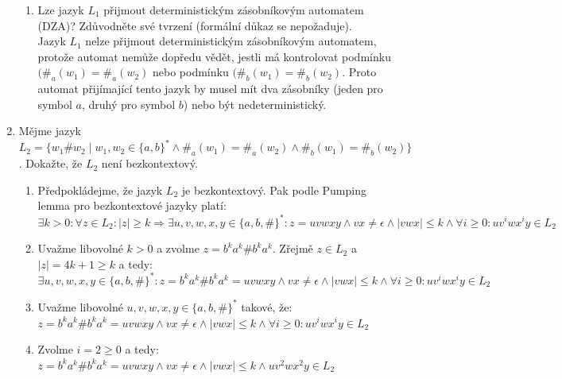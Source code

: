 \documentclass[a4paper,11pt]{article}[24.3.2010]
\begin{document}
\begin{enumerate}
\begin{enumerate}
    \item Lze jazyk $L_{1}$ přijmout deterministickým zásobníkovým automatem (DZA)? Zdůvodněte své tvrzení (formální důkaz se nepožaduje).\\

     Jazyk $L_{1}$ nelze přijmout deterministickým zásobníkovým automatem, protože automat nemůže dopředu vědět, jestli má kontrolovat podmínku $(\#_{a}(w_{1}) =  \#_{a}(w_{2})$ nebo podmínku $(\#_{b}(w_{1}) =  \#_{b}(w_{2})$. Proto automat přijímající tento jazyk by musel mít dva zásobníky (jeden pro symbol $a$, druhý pro symbol $b$) nebo být nedeterministický.
  \end{enumerate}
  \renewcommand{\theenumi}{\arabic{enumi}}

  \newpage

\item Mějme jazyk $L_{2}=\{w_{1}\#w_{2} \mid w_{1},w_{2} \in \{a,b\}^* \wedge \#_{a}(w_{1}) =  \#_{a}(w_{2}) \wedge \#_{b}(w_{1}) =  \#_{b}(w_{2})\}$. Dokažte, že $L_{2}$ není bezkontextový.\\

\begin{enumerate}

\item Předpokládejme, že jazyk $L_{2}$ je bezkontextový. Pak podle Pumping lemma pro bezkontextové jazyky platí:\\
$\exists k > 0 : \forall z \in L_{2}: |z| \geq k \Rightarrow \exists u,v,w,x,y \in \{a,b,\#\}^{*}: z = uvwxy \wedge vx \neq \epsilon \wedge |vwx| \leq k \wedge \forall i \geq 0: uv^{i}wx^{i}y \in L_{2}$\\

\item Uvažme libovolné $k > 0$ a zvolme $z=b^{k}a^{k}\#b^{k}a^{k}$. Zřejmě $z \in L_{2}$ a $|z| = 4k+1 \geq k$ a tedy:\\
$\exists u,v,w,x,y \in \{a,b,\#\}^{*}: z = b^{k}a^{k}\#b^{k}a^{k} = uvwxy \wedge vx \neq \epsilon \wedge |vwx| \leq k \wedge \forall i \geq 0: uv^{i}wx^{i}y \in L_{2}$\\

\item Uvažme libovolné $u,v,w,x,y \in \{a,b,\#\}^{*}$ takové, že:\\
$z = b^{k}a^{k}\#b^{k}a^{k} = uvwxy \wedge vx \neq \epsilon \wedge |vwx| \leq k \wedge \forall i \geq 0: uv^{i}wx^{i}y \in L_{2}$\\

\item Zvolme $i = 2 \geq 0$ a tedy:\\
$z = b^{k}a^{k}\#b^{k}a^{k} = uvwxy \wedge vx \neq \epsilon \wedge |vwx| \leq k \wedge uv^{2}wx^{2}y \in L_{2}$\\


\end{enumerate}
\end{enumerate}
\end{document}
